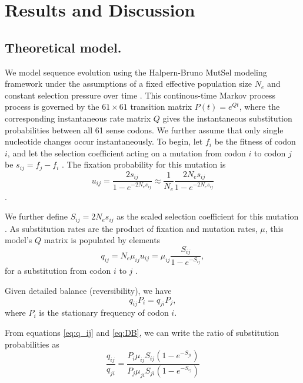 \documentclass[11pt]{article}
\begin{document}
		
\section*{Results and Discussion}
		
		
\subsection*{Theoretical model.}

We model sequence evolution using the Halpern-Bruno MutSel modeling framework under the assumptions of a fixed effective population size $N_e$ and constant selection pressure over time \cite{HalpernBruno1998,YangNielsen2008,Tamurietal2012,Thorne2012}. This continous-time Markov process process is governed by the $61 \times 61$ transition matrix $P(t) = e^{Qt}$, where the corresponding instantaneous rate matrix $Q$ gives the instantaneous substitution probabilities between all 61 sense codons. We further assume that only single nucleotide changes occur instantaneously.
To begin, let $f_i$ be the fitness of codon $i$, and let the selection coefficient acting on a mutation from codon $i$ to codon $j$ be $s_{ij} = f_j - f_i$ \cite{SellaHirsh2005,YangNielsen2008}. The fixation probability for this mutation is 
\begin{equation}\label{eq:u_ij}
u_{ij} = \frac{2s_{ij}}{1 - e^{-2N_es_{ij}}} \approx \frac{1}{N_e}\frac{2N_es_{ij}}{1 - e^{-2N_es_{ij}}}
\end{equation} \cite{Kimura1962,HalpernBruno1998,YangNielsen2008}. 

We further define $S_{ij} = 2N_es_{ij}$ as the scaled selection coefficient for this mutation \cite{YangNielsen2008}. As substitution rates are the product of fixation and mutation rates, $\mu$, this model's $Q$ matrix is populated by elements
\begin{equation}\label{eq:q_ij}
q_{ij} = N_e\mu_{ij}u_{ij} = \mu_{ij}\frac{S_{ij}}{1 - e^{-S_{ij}}} , 
\end{equation} for a substitution from codon $i$ to $j$ \cite{HalpernBruno1998,SellaHirsh2005}. 

Given detailed balance (reversibility), we have 
\begin{equation}\label{eq:DB}
q_{ij}P_i = q_{ji}P_j,
\end{equation} 
where $P_i$ is the stationary frequency of codon $i$. 

From equations \eqref{eq:q_ij} and \eqref{eq:DB}, we can write the ratio of substitution probabilities as 
\begin{equation}\label{ratio_q_ij}
\frac{q_{ij}}{q_{ji}} = \frac{P_i \mu_{ij} S_{ij} (1-e^{-S_{ji}})}{P_j \mu_{ji} S_{ji} (1-e^{-S_{ij}})} 
\end{equation}
\end{document}
